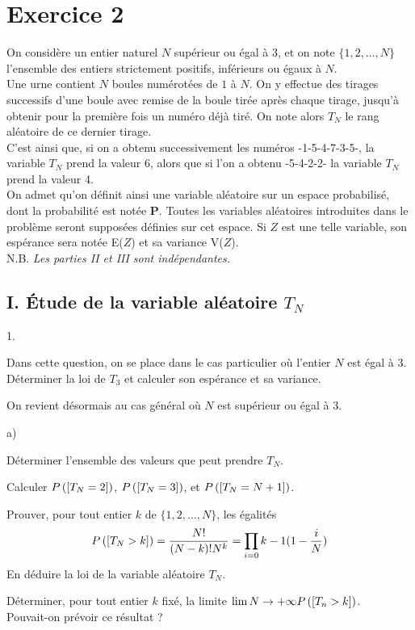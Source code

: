 \documentclass[11pt]{article}%
\begin{document}
\section*{Exercice 2}

On considère un entier naturel $N$ supérieur ou égal à 3, et on note
$\{1,2,\ldots,N\}$ l'ensemble des entiers strictement positifs,
inférieurs
ou égaux à $N$.\\
Une urne contient $N$ boules numérotées de $1$ à $N$. On y effectue des
tirages successifs d'une boule avec remise de la boule tirée après
chaque
tirage, jusqu'à obtenir pour la première fois un numéro déjà tiré. On
note
alors $T_{N}$ le rang aléatoire de ce dernier tirage.\\
C'est ainsi que, si on a obtenu successivement les numéros
-1-5-4-7-3-5-, la
variable $T_{N}$ prend la valeur 6, alors que si l'on a obtenu
-5-4-2-2- la
variable $T_{N}$ prend la valeur 4.\\
On admet qu'on définit ainsi une variable aléatoire sur un espace
probabilisé, dont la probabilité est notée $\mathbf{P}$. Toutes les
variables aléatoires introduites dans le problème seront supposées
définies sur cet
espace. Si $Z$ est une telle variable, son espérance sera notée E($Z$)
et sa
variance V($Z$).\\
N.B. \textit{Les parties II et III sont indépendantes.}

\subsection*{I. Étude de la variable aléatoire $T_{N}$}

\begin{noliste}{1.}
 \setlength{\itemsep}{4mm}
\item Dans cette question, on se place dans le cas particulier où
l'entier $N $ est égal à 3.\\
Déterminer la loi de $T_{3}$ et calculer son espérance et sa variance.

\item On revient désormais au cas général où $N$ est supérieur ou égal
à 3.

\begin{noliste}{a)}
 \setlength{\itemsep}{2mm}
\item Déterminer l'ensemble des valeurs que peut prendre $T_{N}$.

\item Calculer $P\left(\left[ {T_{N} = 2} \right]\right)$, $P\left(\left[ {T_{N} =
3} \right]\right)$, et $P\left(\left[ {T_{N} = N + 1} \right]\right)$.

\item Prouver, pour tout entier $k$ de $\{1,2,\ldots,N\}$, les égalités
\[
P\left(\left[ {T_{N}>k} \right]\right) = \dfrac{N!}{(N-k)!N^{k}} = \prod_{i =
0}{k-1}(1-\dfrac{i}{N})
\]
En déduire la loi de la variable aléatoire $T_{N}$.

\item Déterminer, pour tout entier $k$ fixé, la limite
$\lim{N\rightarrow + \infty }P\left(\left[ {T_{n}>k} \right]\right)$.\\
Pouvait-on prévoir ce résultat ?
\end{noliste}
\end{noliste}
\end{document}
